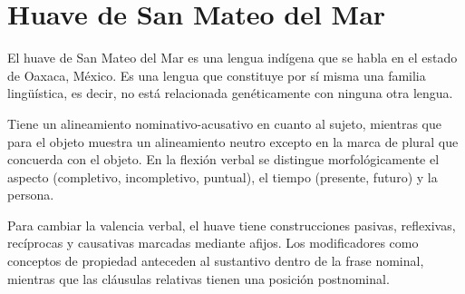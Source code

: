 \section*{Huave de San Mateo del Mar}

\noindent El huave de San Mateo del Mar es una lengua indígena que se habla en el estado de Oaxaca, México. Es una lengua que constituye por sí misma una familia lingüística, es decir, no está relacionada genéticamente con ninguna otra lengua.

Tiene un alineamiento nominativo-acusativo en cuanto al sujeto, mientras que para el objeto muestra un alineamiento neutro excepto en la marca de plural que concuerda con el objeto. En la flexión verbal se distingue morfológicamente el aspecto (completivo, incompletivo, puntual), el tiempo (presente, futuro) y la persona. 

Para cambiar la valencia verbal, el huave tiene construcciones pasivas, reflexivas, recíprocas y causativas marcadas mediante afijos. Los modificadores como conceptos de propiedad anteceden al sustantivo dentro de la frase nominal, mientras que las cláusulas relativas tienen una posición postnominal.\vspace{0.2cm}

